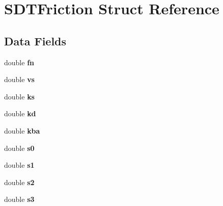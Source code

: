 \hypertarget{struct_s_d_t_friction}{}\section{S\+D\+T\+Friction Struct Reference}
\label{struct_s_d_t_friction}
\subsection*{Data Fields}
\begin{DoxyCompactItemize}
\item 
\hypertarget{struct_s_d_t_friction_a45fc3ab7753d55709d72adff1b69bad0}{}double {\bfseries fn}\label{struct_s_d_t_friction_a45fc3ab7753d55709d72adff1b69bad0}

\item 
\hypertarget{struct_s_d_t_friction_aebb586d1070ffe9f024b2978c19c4fa8}{}double {\bfseries vs}\label{struct_s_d_t_friction_aebb586d1070ffe9f024b2978c19c4fa8}

\item 
\hypertarget{struct_s_d_t_friction_a6ac856e9183ca1c791fee3d2d47e7477}{}double {\bfseries ks}\label{struct_s_d_t_friction_a6ac856e9183ca1c791fee3d2d47e7477}

\item 
\hypertarget{struct_s_d_t_friction_a1cf17dd45e85748457863776dcb28335}{}double {\bfseries kd}\label{struct_s_d_t_friction_a1cf17dd45e85748457863776dcb28335}

\item 
\hypertarget{struct_s_d_t_friction_a5c815cbf4a144287fac2a494e7f12c6d}{}double {\bfseries kba}\label{struct_s_d_t_friction_a5c815cbf4a144287fac2a494e7f12c6d}

\item 
\hypertarget{struct_s_d_t_friction_aa857ed5c081381af534715a410da6fa3}{}double {\bfseries s0}\label{struct_s_d_t_friction_aa857ed5c081381af534715a410da6fa3}

\item 
\hypertarget{struct_s_d_t_friction_a2871a1979bfda417aeb0da473e54ce00}{}double {\bfseries s1}\label{struct_s_d_t_friction_a2871a1979bfda417aeb0da473e54ce00}

\item 
\hypertarget{struct_s_d_t_friction_a307aae610cd76b3f903174cdc6974986}{}double {\bfseries s2}\label{struct_s_d_t_friction_a307aae610cd76b3f903174cdc6974986}

\item 
\hypertarget{struct_s_d_t_friction_af279c54adc756bd4f11d308a5dee38c4}{}double {\bfseries s3}\label{struct_s_d_t_friction_af279c54adc756bd4f11d308a5dee38c4}


\end{DoxyCompactItemize}
